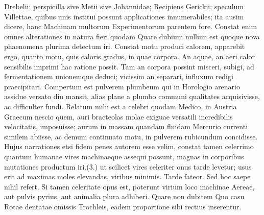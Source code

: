 Drebelii\protect{}; perspicilla \protect{} sive Metii\protect{} sive Johannidae\protect{}; Recipiens Gerickii\protect{}; speculum Villettae\protect{}\protect{}, quibus unis institui possunt applicationes innumerabiles; ita ausim dicere, hanc  Machinam multorum Experimentorum parentem fore. Constat enim omnes alterationes in natura fieri  quodam  Quare dubium nullum est  quoque  nova phaenomena plurima detectum iri. Constat motu produci calorem\protect{}, apparebit ergo, quanto motu, quis caloris\protect{} gradus, in quae corpora. An aquae, an aeri  calor\protect{} sensibilis imprimi hac ratione possit. Tam an corpora possint misceri, subigi, ad fermentationem\protect{} unionemque deduci; vicissim an separari, influxum redigi praecipitari. Compertum est pulverem plumbeum\protect{} qui in Horologio arenario\protect{} assidue versato diu mansit, alias plane a plumbo\protect{} communi qualitates acquisivisse, ac difficulter fundi. Relatum mihi est a celebri quodam Medico, in Austria\protect{} Graecum nescio quem, auri bracteolas molae exiguae versatili incredibilis velocitatis, imposuisse; aurum\protect{} in massam quandam fluidam Mercurio\protect{} currenti similem abiisse, ac demum continuato motu, in pulverem rubicundum concidisse. Hujus narrationes etsi fidem penes autorem esse velim, constat tamen  celerrimo quantum humanae vires machinaeque assequi possunt, magnas in corporibus mutationes productum iri.\pend \pstart (3.)  ut scilicet vires celeriter onus tarde levetur; usus erit ad maximas moles elevandas, viribus minimis. Tarde fateor. Sed hoc saepe nihil refert. Si tamen celeritate opus est, poterunt virium loco machinae Aereae, aut pulvis pyrius\protect{}, aut animalia plura adhiberi. Quare non dubitem  Quo casu Rotae dentatae\protect{} omissis Trochleis\protect{}, eadem proportione sibi rectius inserentur.\pend